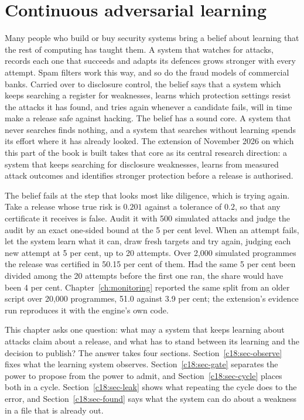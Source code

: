 \chapter{Continuous adversarial learning}\label{ch:learning}

Many people who build or buy security systems bring a belief about learning that the rest
of computing has taught them. A system that watches for attacks, records each one that
succeeds and adapts its defences grows stronger with every attempt. Spam filters work this
way, and so do the fraud models of commercial banks. Carried over to disclosure control,
the belief says that a system which keeps searching a register for weaknesses, learns which
protection settings resist the attacks it has found, and tries again whenever a candidate fails,
will in time make a release safe against hacking. The belief has a sound core. A system that
never searches finds nothing, and a system that searches without learning spends its effort
where it has already looked. The extension of November 2026 on which this part of the
book is built takes that core as its central research direction: a system that keeps searching
for disclosure weaknesses, learns from measured attack outcomes and identifies stronger
protection before a release is authorised.

The belief fails at the step that looks most like diligence, which is trying again. Take a
release whose true risk is $0.201$ against a tolerance of $0.2$, so that any certificate it receives is
false. Audit it with 500 simulated attacks and judge the audit by an exact one-sided bound
at the 5 per cent level. When an attempt fails, let the system learn what it can, draw fresh
targets and try again, judging each new attempt at 5 per cent, up to 20 attempts. Over 2,000
simulated programmes the release was certified in 50.15 per cent of them.
Had the same 5 per cent been divided among the 20 attempts before the first one ran, the share would
have been 4 per cent. Chapter~\ref{ch:monitoring} reported the same split from an older script over 20,000
programmes, 51.0 against 3.9 per cent; the extension's evidence run reproduces it with the
engine's own code.

This chapter asks one question: what may a system that keeps learning about attacks claim about a
release, and what has to stand between its learning and the decision to publish? The answer takes
four sections. Section~\ref{c18:sec-observe} fixes what the learning system observes.
Section~\ref{c18:sec-gate} separates the power to propose from the power to admit, and
Section~\ref{c18:sec-cycle} places both in a cycle. Section~\ref{c18:sec-leak} shows what repeating the
cycle does to the error, and Section~\ref{c18:sec-found} says what the system can do about a weakness in a
file that is already out.

